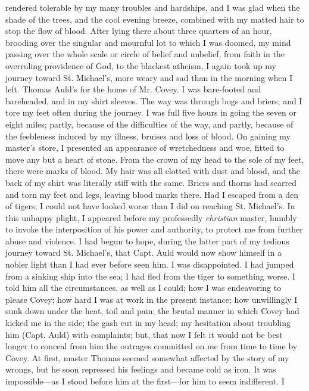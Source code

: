 rendered tolerable by my many troubles and hardships, {}and I was glad
when the shade of the trees, and the cool evening breeze, combined with
my matted hair to stop the flow of blood. After lying there about three
quarters of an hour, brooding over the singular and mournful lot to
which I was doomed, my mind passing over the whole scale or circle of
belief and unbelief, from faith in the overruling providence of God, to
the blackest atheism, I again took up my journey toward St. Michael's,
more weary and sad than in the morning when I left. Thomas Auld's for
the home of Mr. Covey. I was bare-footed and bareheaded, and in my shirt
sleeves. The way was through bogs and briers, and I tore my feet often
during the journey. I was full five hours in going the seven or eight
miles; partly, because of the difficulties of the way, and partly,
because of the feebleness induced by my illness, bruises and loss of
blood. On gaining my master's store, I presented an appearance of
wretchedness and woe, fitted to move any but a heart of stone. From the
crown of my head to the sole of my feet, there were marks of blood. My
hair was all clotted with dust and blood, and the back of my shirt was
literally stiff with the same. Briers and thorns had scarred and torn my
feet and legs, leaving blood marks there. Had I escaped from a den of
tigers, I could not have looked worse than I did on reaching St.
Michael's. In this unhappy plight, I appeared before my professedly
\emph{christian} master, humbly to invoke the interposition of his power
and authority, to protect me from further abuse and violence. I had
begun to hope, during the latter part of my tedious journey toward St.
Michael's, that Capt. Auld would {} now show himself in a nobler light
than I had ever before seen him. I was disappointed. I had jumped from a
sinking ship into the sea; I had fled from the tiger to something worse.
I told him all the circumstances, as well as I could; how I was
endeavoring to please Covey; how hard I was at work in the present
instance; how unwillingly I sunk down under the heat, toil and pain; the
brutal manner in which Covey had kicked me in the side; the gash cut in
my head; my hesitation about troubling him (Capt. Auld) with complaints;
but, that now I felt it would not be best longer to conceal from him the
outrages committed on me from time to time by Covey. At first, master
Thomas seemed somewhat affected by the story of my wrongs, but he soon
repressed his feelings and became cold as iron. It was impossible---as I
stood before him at the first---for him to seem indifferent. I
